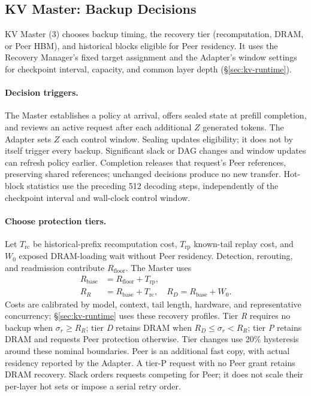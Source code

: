 \subsection{KV Master: Backup Decisions}
\label{sec:kv-placement}
\label{sec:kv-master}

KV Master (3) chooses backup timing, the recovery tier (recomputation,
DRAM, or Peer HBM), and historical blocks eligible for Peer residency.
It uses the Recovery Manager's fixed target assignment and the Adapter's
window settings for checkpoint interval, capacity, and common layer
depth (\S\ref{sec:kv-runtime}).

\paragraph{Decision triggers.}
The Master establishes a policy at arrival, offers sealed state at
prefill completion, and reviews an active request after each additional
$Z$ generated tokens. The Adapter sets $Z$ each control window. Sealing
updates eligibility; it does not by itself trigger every backup.
Significant slack or DAG changes and window updates can refresh policy
earlier. Completion releases that request's Peer references, preserving
shared references; unchanged decisions produce no new transfer.
Hot-block statistics use the preceding 512 decoding steps, independently
of the checkpoint interval and wall-clock control window.

\paragraph{Choose protection tiers.}
Let $T_{\mathrm{rc}}$ be historical-prefix recomputation cost,
$T_{\mathrm{rp}}$ known-tail replay cost, and $W_0$ exposed DRAM-loading
wait without Peer residency. Detection, rerouting, and readmission
contribute $R_{\mathrm{floor}}$. The Master uses
\begin{equation}
\begin{aligned}
 R_{\mathrm{base}}&=R_{\mathrm{floor}}+T_{\mathrm{rp}},\\
 R_R&=R_{\mathrm{base}}+T_{\mathrm{rc}},\quad
 R_D=R_{\mathrm{base}}+W_0.
\end{aligned}
\label{eq:recovery-base}
\end{equation}
Costs are calibrated by model, context, tail length, hardware, and
representative concurrency; \S\ref{sec:kv-runtime} uses these recovery profiles.
Tier \emph{R} requires no backup when $\sigma_r\ge R_R$;
tier \emph{D} retains DRAM when $R_D\le\sigma_r<R_R$;
tier \emph{P} retains DRAM and requests Peer protection otherwise.
Tier changes use 20\% hysteresis around these nominal boundaries.
Peer is an additional fast copy, with actual residency reported by
the Adapter. A tier-P request with no Peer grant retains DRAM recovery.
Slack orders requests competing for Peer; it does not scale their
per-layer hot sets or impose a serial retry order.

